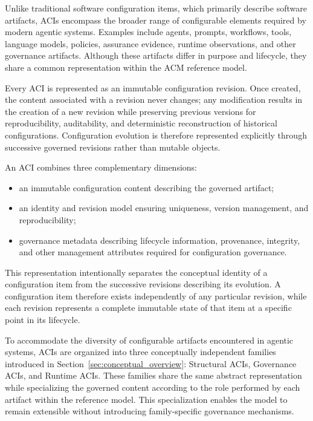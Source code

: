 \documentclass[10pt]{article}
\begin{document}
Unlike traditional software configuration items, which primarily describe software artifacts, ACIs encompass the broader range of configurable elements required by modern agentic systems. Examples include agents, prompts, workflows, tools, language models, policies, assurance evidence, runtime observations, and other governance artifacts. Although these artifacts differ in purpose and lifecycle, they share a common representation within the ACM reference model.

Every ACI is represented as an immutable configuration revision. Once created, the content associated with a revision never changes; any modification results in the creation of a new revision while preserving previous versions for reproducibility, auditability, and deterministic reconstruction of historical configurations. Configuration evolution is therefore represented explicitly through successive governed revisions rather than mutable objects.

An ACI combines three complementary dimensions:

\begin{itemize}

\item an immutable configuration content describing the governed artifact;

\item an identity and revision model ensuring uniqueness, version management, and reproducibility;

\item governance metadata describing lifecycle information, provenance, integrity, and other management attributes required for configuration governance.

\end{itemize}

This representation intentionally separates the conceptual identity of a configuration item from the successive revisions describing its evolution. A configuration item therefore exists independently of any particular revision, while each revision represents a complete immutable state of that item at a specific point in its lifecycle.

To accommodate the diversity of configurable artifacts encountered in agentic systems, ACIs are organized into three conceptually independent families introduced in Section~\ref{sec:conceptual_overview}: Structural ACIs, Governance ACIs, and Runtime ACIs. These families share the same abstract representation while specializing the governed content according to the role performed by each artifact within the reference model. This specialization enables the model to remain extensible without introducing family-specific governance mechanisms.
\end{document}
